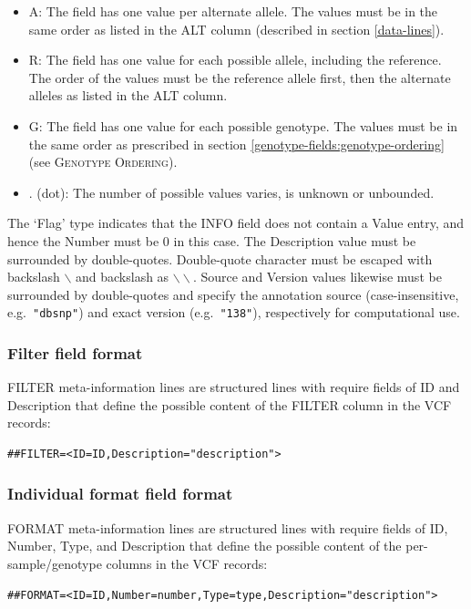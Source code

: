 \documentclass[8pt]{article}
\begin{document}
\begin{itemize}
  \item A: The field has one value per alternate allele.
  The values must be in the same order as listed in the ALT column (described in section \ref{data-lines}).
  \item R: The field has one value for each possible allele, including the reference.
  The order of the values must be the reference allele first, then the alternate alleles as listed in the ALT column.
  \item G: The field has one value for each possible genotype.
  The values must be in the same order as prescribed in section \ref{genotype-fields:genotype-ordering} (see \textsc{Genotype Ordering}).
  \item . (dot): The number of possible values varies, is unknown or unbounded.
\end{itemize}

The `Flag' type indicates that the INFO field does not contain a Value entry, and hence the Number must be $0$ in this case.
The Description value must be surrounded by double-quotes.
Double-quote character must be escaped with backslash $\backslash$ and backslash as $\backslash\backslash$.
Source and Version values likewise must be surrounded by double-quotes and specify the annotation source (case-insensitive, e.g.\ \verb|"dbsnp"|) and exact version (e.g.\ \verb|"138"|), respectively for computational use.

\subsubsection{Filter field format}
FILTER meta-information lines are structured lines with require fields of ID and Description that define the possible content of the FILTER column in the VCF records:

\begin{verbatim}
##FILTER=<ID=ID,Description="description">
\end{verbatim}

\subsubsection{Individual format field format}
FORMAT meta-information lines are structured lines with require fields of ID, Number, Type, and Description that define the possible content of the per-sample/genotype columns in the VCF records:

\begin{verbatim}
##FORMAT=<ID=ID,Number=number,Type=type,Description="description">
\end{verbatim}
\end{document}
